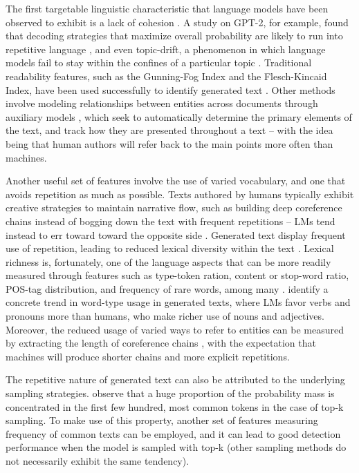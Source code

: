 The first targetable linguistic characteristic that language models have been observed to exhibit is a lack of cohesion \citep{holtzman2019curious}.
A study on GPT-2, for example, found that decoding strategies that maximize overall probability are likely to run into repetitive language \citep{see2019massively}, and even topic-drift, a phenomenon in which language models fail to stay within the confines of a particular topic \citep{badaskar2008identifying}.
Traditional readability features, such as the Gunning-Fog Index and the Flesch-Kincaid Index, have been used successfully to identify generated text \citep{Crothers_2022}.
Other methods involve modeling relationships between entities across documents through auxiliary models \citep{barzilay2008modeling}, which seek to automatically determine the primary elements of the text, and track how they are presented throughout a text -- with the idea being that human authors will refer back to the main points more often than machines.

Another useful set of features involve the use of varied vocabulary, and one that avoids repetition as much as possible.
Texts authored by humans typically exhibit creative strategies to maintain narrative flow, such as building deep coreference chains instead of bogging down the text with frequent repetitions \citep{feng2010comparison} -- LMs tend instead to err toward toward the opposite side \citep{gehrmann2019gltrstatisticaldetectionvisualization}.
Generated text display frequent use of repetition, leading to reduced lexical diversity within the text \citep{zellers2020evaluating}.
Lexical richness is, fortunately, one of the language aspects that can be more readily measured through features such as type-token ration, content or stop-word ratio, POS-tag distribution, and frequency of rare words, among many \citep{van2007comparing}.
\citet{see2019massively} identify a concrete trend in word-type usage in generated texts, where LMs favor verbs and pronouns more than humans, who make richer use of nouns and adjectives.
Moreover, the reduced usage of varied ways to refer to entities can be measured by extracting the length of coreference chains \citep{feng2010comparison}, with the expectation that machines will produce shorter chains and more explicit repetitions.

The repetitive nature of generated text can also be attributed to the underlying sampling strategies.
\citet{ippolito2019automatic} observe that a huge proportion of the probability mass is concentrated in the first few hundred, most common tokens in the case of top-k sampling.
To make use of this property, another set of features measuring frequency of common texts can be employed, and it can lead to good detection performance when the model is sampled with top-k (other sampling methods do not necessarily exhibit the same tendency).


